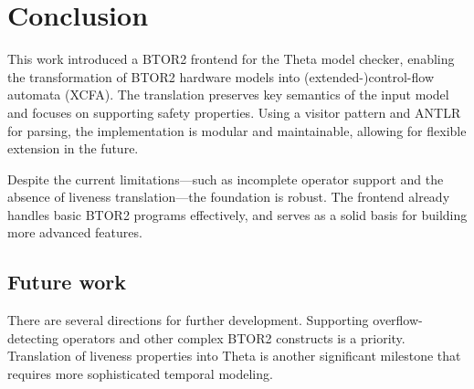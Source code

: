 \begin{table}[]
\label{table:errors}
\caption{ Summary of errors }
\end{table}

\section{Conclusion}
This work introduced a BTOR2 frontend for the Theta model checker, enabling the transformation of BTOR2 hardware models into (extended-)control-flow automata (XCFA). The translation preserves key semantics of the input model and focuses on supporting safety properties. Using a visitor pattern and ANTLR for parsing, the implementation is modular and maintainable, allowing for flexible extension in the future.

Despite the current limitations—such as incomplete operator support and the absence of liveness translation—the foundation is robust. The frontend already handles basic BTOR2 programs effectively, and serves as a solid basis for building more advanced features.

\subsection{Future work}
There are several directions for further development. Supporting overflow-detecting operators and other complex BTOR2 constructs is a priority. Translation of liveness properties into Theta is another significant milestone that requires more sophisticated temporal modeling.

